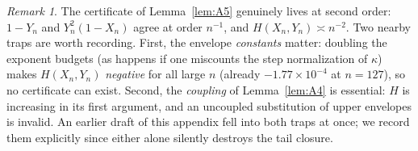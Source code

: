 \documentclass[11pt]{amsart}
\theoremstyle{definition}
\theoremstyle{remark}
\newtheorem{remark}[theorem]{Remark}
\begin{document}
\begin{remark}\label{rem:sharp-envelopes}
The certificate of Lemma~\ref{lem:A5} genuinely lives at second order:
$1-Y_n$ and $Y_n^{2}(1-X_n)$ agree at order $n^{-1}$, and
$H(X_n,Y_n)\asymp n^{-2}$. Two nearby traps are worth recording.
First, the envelope \emph{constants} matter: doubling the exponent
budgets (as happens if one miscounts the step normalization of
$\kappa$) makes $H(X_n,Y_n)$ \emph{negative} for all large $n$
(already $-1.77\times10^{-4}$ at $n=127$), so no certificate can
exist. Second, the \emph{coupling} of Lemma~\ref{lem:A4} is essential:
$H$ is increasing in its first argument, and an uncoupled substitution
of upper envelopes is invalid. An earlier draft of this appendix fell
into both traps at once; we record them explicitly since either alone
silently destroys the tail closure.
\end{remark}
\end{document}
